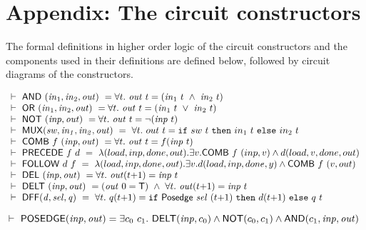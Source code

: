 \documentclass{llncs}
\begin{document}
\section*{Appendix: The circuit constructors}
\label{CircuitConstructors}
\vspace*{-3mm}

The formal definitions in higher order logic of the circuit
constructors and the components used in their definitions are defined
below, followed by circuit diagrams of the constructors.

\begin{footnotesize}

\medskip
$
\begin{array}{l}
\TURNST\ \DEF{AND}\ (\sVAR{in}{1},\sVAR{in}{2},\VAR{out}) ~ = 
   \forall t.\ \VAR{out}\ t = (\sVAR{in}{1}\ t\ \AND\ \sVAR{in}{2}\ t)\\
\TURNST\ \DEF{OR}\ (\sVAR{in}{1},\sVAR{in}{2},\VAR{out}) ~ =
   \forall t.\ \VAR{out}\ t = (\sVAR{in}{1}\ t\ \OR\ \sVAR{in}{2}\ t)\\
\TURNST\ \DEF{NOT}\ (\VAR{inp},\VAR{out}) ~ = 
   \forall t.\ \VAR{out}\ t = \NOT(\VAR{inp}\ t)\\
\TURNST\ \DEF{MUX} (\VAR{sw,in_1,in_2,out})~ =~
 \forall t.\ out~t =  \IF{sw~t}{in_1~t}{in_2~t}\\
\TURNST\ \DEF{COMB}\ f\ \VAR{(inp,out)} ~ = \forall t.\ \VAR{out}\ t = f (\VAR{inp}\ t)\\
\TURNST\ \DEF{PRECEDE}\ f\ d~ =~
         \lambda(load,inp,done,out). \exists v. \DEF{COMB}~f~(inp,v) \wedge d(load,v,done,out)\\
\TURNST\ \DEF{FOLLOW}\ d\ f~ =~
         \lambda(load,inp,done,out). \exists v. d(load,inp,done,y) \wedge \DEF{COMB}~f~(v,out)\\
\TURNST\ \DEF{DEL}\ (\VAR{inp},\VAR{out}) ~ = \forall t.\ \VAR{out} (t{+}1) = \VAR{inp}\ t\\
\TURNST\ \DEF{DELT}\ (\VAR{inp},\VAR{out}) ~ = 
    (\VAR{out}\ 0 = \DEF{T})\ \AND\ 
    \forall t.\ \VAR{out} (t{+}1) = \VAR{inp}\ t\\
\TURNST\ \DEF{DFF} (\VAR{d,sel,q})~ =~
 \forall t.\ q (t{+}1) =  \IF{\DEF{Posedge}\ \VAR{sel}\ (t{+}1)}{d (t{+}1)}{q\ t}
\end{array}
$
 
\smallskip

$
\mbox{}\hspace*{-0.4mm}\TURNST\ \DEF{POSEDGE} (\VAR{inp},\VAR{out}) = 
    \exists c_0~ c_1.\ \DEF{DELT}(\VAR{inp},c_0) \AND
                  \DEF{NOT}(c_0, c_1) \AND \DEF{AND}(c_1,\VAR{inp},\VAR{out})
$


\end{footnotesize}
\end{document}
